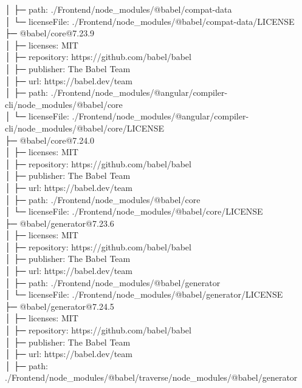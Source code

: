 \documentclass[
    paper=a4,
    twoside=false,
    parskip=half,
    listof=entryprefix,
    listof=totoc,
    index=totoc,
    bibliography=totoc,
    headsepline,
]{scrbook}
\begin{document}
    │  ├─ path: ./Frontend/node\_modules/@babel/compat-data\\
    │  └─ licenseFile: ./Frontend/node\_modules/@babel/compat-data/LICENSE\\
    ├─ @babel/core@7.23.9\\
    │  ├─ licenses: MIT\\
    │  ├─ repository: https://github.com/babel/babel\\
    │  ├─ publisher: The Babel Team\\
    │  ├─ url: https://babel.dev/team\\
    │  ├─ path: ./Frontend/node\_modules/@angular/compiler-cli/node\_modules/@babel/core\\
    │  └─ licenseFile: ./Frontend/node\_modules/@angular/compiler-cli/node\_modules/@babel/core/LICENSE\\
    ├─ @babel/core@7.24.0\\
    │  ├─ licenses: MIT\\
    │  ├─ repository: https://github.com/babel/babel\\
    │  ├─ publisher: The Babel Team\\
    │  ├─ url: https://babel.dev/team\\
    │  ├─ path: ./Frontend/node\_modules/@babel/core\\
    │  └─ licenseFile: ./Frontend/node\_modules/@babel/core/LICENSE\\
    ├─ @babel/generator@7.23.6\\
    │  ├─ licenses: MIT\\
    │  ├─ repository: https://github.com/babel/babel\\
    │  ├─ publisher: The Babel Team\\
    │  ├─ url: https://babel.dev/team\\
    │  ├─ path: ./Frontend/node\_modules/@babel/generator\\
    │  └─ licenseFile: ./Frontend/node\_modules/@babel/generator/LICENSE\\
    ├─ @babel/generator@7.24.5\\
    │  ├─ licenses: MIT\\
    │  ├─ repository: https://github.com/babel/babel\\
    │  ├─ publisher: The Babel Team\\
    │  ├─ url: https://babel.dev/team\\
    │  ├─ path: ./Frontend/node\_modules/@babel/traverse/node\_modules/@babel/generator\\
\end{document}
